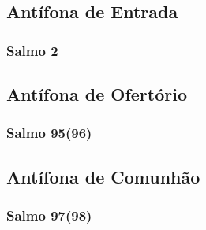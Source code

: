 \subsection{Antífona de Entrada}
\nopagebreak


\subsubsection{Salmo 2}
\nopagebreak


\AllowPageFlush

\subsection{Antífona de Ofertório}
\nopagebreak


\subsubsection{Salmo 95(96)}
\nopagebreak


\subsection{Antífona de Comunhão}
\nopagebreak


\subsubsection{Salmo 97(98)}
\nopagebreak
